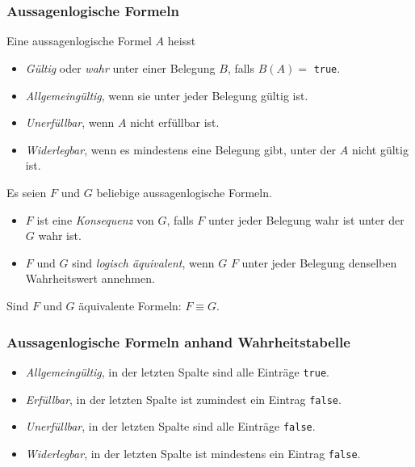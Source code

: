\subsubsection{Aussagenlogische Formeln}%
\label{ssub:aussagenlogische_formeln}
\begin{minipage}{0.9\linewidth}
Eine aussagenlogische Formel $A$ heisst
\begin{itemize}
 \item \textit{Gültig} oder \textit{wahr} unter einer Belegung $B$, falls $\hat{B}(A)=$ \texttt{true}.
 \item \textit{Allgemeingültig}, wenn sie unter jeder Belegung gültig ist.
 \item \textit{Unerfüllbar}, wenn $A$ nicht erfüllbar ist.
 \item \textit{Widerlegbar}, wenn es mindestens eine Belegung gibt, unter der $A$ nicht gültig ist.
\end{itemize}
Es seien $F$ und $G$ beliebige aussagenlogische Formeln.
\begin{itemize}
 \item $F$ ist eine \textit{Konsequenz} von $G$, falls $F$ unter jeder Belegung wahr ist unter der $G$ wahr ist.
 \item $F$ und $G$ sind \textit{logisch äquivalent}, wenn $G$ $F$ unter jeder Belegung denselben Wahrheitswert annehmen.
\end{itemize}
Sind $F$ und $G$ äquivalente Formeln: $F\equiv G$.
\end{minipage}

\subsubsection{Aussagenlogische Formeln anhand Wahrheitstabelle}
\begin{minipage}{0.9\linewidth}
\begin{itemize}
    \item \textit{Allgemeingültig}, in der letzten Spalte sind alle Einträge \texttt{true}.
    \item \textit{Erfüllbar}, in der letzten Spalte ist zumindest ein Eintrag \texttt{false}.
    \item \textit{Unerfüllbar}, in der letzten Spalte sind alle Einträge \texttt{false}.
    \item \textit{Widerlegbar}, in der letzten Spalte ist mindestens ein Eintrag \texttt{false}.
\end{itemize}
\end{minipage}

